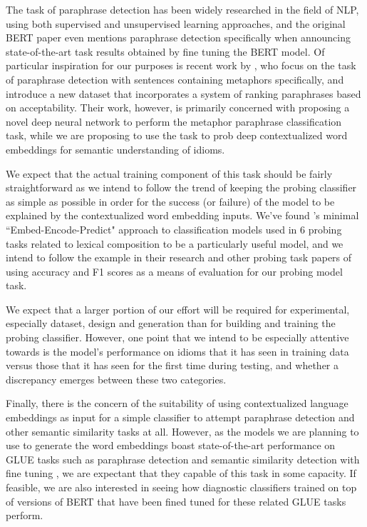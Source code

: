 \documentclass[11pt,a4paper]{article}
\begin{document}
The task of paraphrase detection has been widely researched in the field of NLP, using both supervised and unsupervised learning approaches, and the original BERT paper \citep{devlin2018bert} even mentions paraphrase detection specifically when announcing state-of-the-art task results obtained by fine tuning the BERT model.
Of particular inspiration for our purposes is recent work by \citet{bizzoni-lappin-2018-predicting}, who focus on the task of paraphrase detection with sentences containing metaphors specifically, and introduce a new dataset that incorporates a system of ranking paraphrases based on acceptability. Their work, however, is primarily concerned with proposing a novel deep neural network to perform the metaphor paraphrase classification task, while we are proposing to use the task to prob deep contextualized word embeddings for semantic understanding of idioms.

We expect that the actual training component of this task should be fairly straightforward as we intend to follow the trend of keeping the probing classifier as simple as possible in order for the success (or failure) of the model to be explained by the contextualized word embedding inputs. We've found \citet{shwartz2019pain}'s minimal ``Embed-Encode-Predict" approach to classification models used in 6 probing tasks related to lexical composition to be a particularly useful model, and we intend to follow the example in their research and other probing task papers of using accuracy and F1 scores as a means of evaluation for our probing model task.

We expect that a larger portion of our effort will be required for experimental, especially dataset, design and generation than for building and training the probing classifier. However, one point that we intend to be especially attentive towards is the model's performance on idioms that it has seen in training data versus those that it has seen for the first time during testing, and whether a discrepancy emerges between these two categories.

Finally, there is the concern of the suitability of using contextualized language embeddings as input for a simple classifier to attempt paraphrase detection and other semantic similarity tasks at all. However, as the models we are planning to use to generate the word embeddings boast state-of-the-art performance on GLUE tasks such as paraphrase detection and semantic similarity detection with fine tuning \citep{devlin2018bert}, we are expectant that they capable of this task in some capacity. If feasible, we are also interested in seeing how diagnostic classifiers trained on top of versions of BERT that have been fined tuned for these related GLUE tasks perform. 
\end{document}
